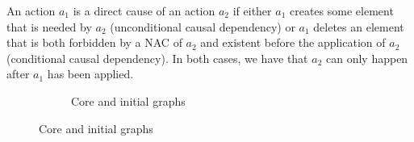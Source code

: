 \begin{intuition} An action $a_1$ is a direct cause of an action $a_2$ if either $a_1$ creates some element that is needed by $a_2$ (unconditional causal dependency) or $a_1$ deletes an element that is both forbidden by a NAC of $a_2$ and existent before the application of $a_2$ (conditional causal dependency). In both cases, we have that $a_2$ can only happen after $a_1$ has been applied. 
\end{intuition}

\begin{figure}[!ht]
  \centering
  \begin{subfigure}[t]{.5\textwidth}
    \centerline{}
    \caption{Core and initial graphs}\label{fig:process:unconditional-relation:core-graph}
  \end{subfigure}


\end{figure}

